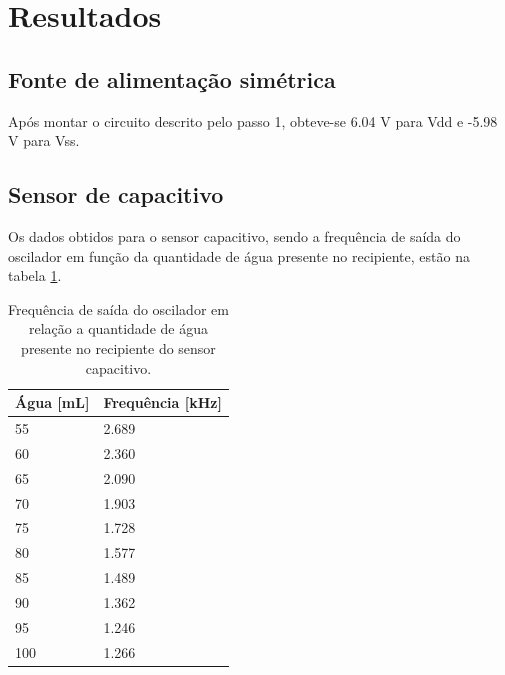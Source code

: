 \newpage
\section{Resultados}

\subsection{Fonte de alimentação simétrica}
Após montar o circuito descrito pelo passo 1, obteve-se 6.04 V para Vdd e -5.98 V para Vss.


\subsection{Sensor de capacitivo}
Os dados obtidos para o sensor capacitivo, sendo a frequência de saída do oscilador em função da quantidade de água presente no recipiente, estão na tabela \ref{t_oscdata}.

\begin{small}
    \begin{table}[H]
        \begin{center}
            \caption{Frequência de saída do oscilador em relação a quantidade de água presente no recipiente do sensor capacitivo.}
            \begin{tabular}{l|l}
                \hline
                Água [mL] & Frequência [kHz] \\
                \hline
                55  & 2.689 \\
                \hline
                60  & 2.360 \\
                \hline
                65  & 2.090 \\
                \hline
                70  & 1.903 \\
                \hline
                75  & 1.728 \\
                \hline
                80  & 1.577 \\
                \hline
                85  & 1.489 \\
                \hline
                90  & 1.362 \\
                \hline
                95  & 1.246 \\
                \hline
                100 & 1.266 \\
                \hline
            \end{tabular}
            \label{t_oscdata}
        \end{center}
    \end{table}
\end{small}

